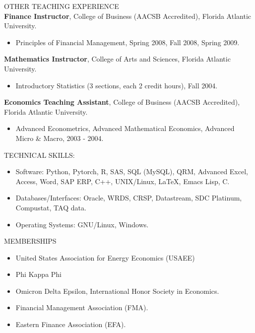 \documentclass[9pt]{article}
\begin{document}
\noindent OTHER TEACHING EXPERIENCE\\
{\bf Finance Instructor}, College of Business (AACSB Accredited), Florida Atlantic University.
\begin{itemize}[noitemsep, nolistsep]
\item Principles of Financial Management, Spring 2008, Fall 2008, Spring 2009.
\end{itemize}
{\bf Mathematics Instructor}, College of Arts and Sciences, Florida Atlantic University.
\begin{itemize}[noitemsep, nolistsep]
\item Introductory Statistics (3 sections, each 2 credit hours), Fall 2004.
\end{itemize}
{\bf Economics Teaching Assistant}, College of Business (AACSB Accredited), Florida Atlantic University.
\begin{itemize}[noitemsep, nolistsep]
\item Advanced Econometrics, Advanced Mathematical Economics, Advanced Micro \& Macro, 2003 - 2004.
\end{itemize}
\vspace{10pt}
TECHNICAL SKILLS:
\begin{itemize}[noitemsep, nolistsep]
\item Software: Python, Pytorch, R, SAS, SQL (MySQL), QRM, Advanced Excel, Access, Word, SAP ERP, C++, UNIX/Linux, \LaTeX, Emacs Lisp, C. 
\item Databases/Interfaces: Oracle, WRDS, CRSP, Datastream, SDC Platinum, Compustat, TAQ data.
\item Operating Systems: GNU/Linux, Windows.
\end{itemize}
\vspace{10pt}
MEMBERSHIPS
\begin{itemize}[noitemsep, nolistsep]
\item United States Association for Energy Economics (USAEE)
\item Phi Kappa Phi
\item Omicron Delta Epsilon, International Honor Society in Economics.
\item Financial Management Association (FMA).
\item Eastern Finance Association (EFA).
\end{itemize}
\vspace{15pt}
\end{document}
